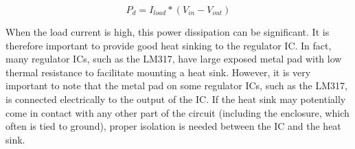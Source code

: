\documentclass[letterpaper, 11pt]{article}
\begin{document}
\begin{equation}
	P_d=I_{load}*\left( V_{in}-V_{out}\right)
\end{equation}

When the load current is high, this power dissipation can be significant. It is therefore important to provide good heat sinking to the regulator IC. In fact, many regulator ICs, such as the LM317,  have large exposed metal pad with low thermal resistance to facilitate mounting a heat sink.  However, it is very important to note that the metal pad on some regulator ICs, such as the LM317, is connected electrically to the output of the IC. If the heat sink may potentially come in contact with any other part of the circuit (including the enclosure, which often is tied to ground), proper isolation is needed between the IC and the heat sink. 
%
\end{document}
